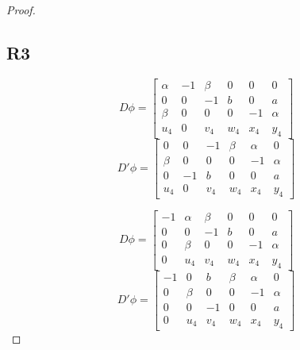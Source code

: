 \begin{proof}
  \subsection*{\centering R3}

  $$D\phi=
  \begin{bmatrix}
    \alpha & -1 & \beta & 0 & 0 & 0 \\ 
    0 & 0 & -1 & b & 0 & a \\ 
    \beta & 0 & 0 & 0 & -1 & \alpha \\ 
    u_4 & 0 & v_4 & w_4 & x_4 & y_4
  \end{bmatrix}
  $$
  $$D'\phi=
  \begin{bmatrix}
    0 & 0 & -1 & \beta & \alpha & 0 \\ 
    \beta & 0 & 0 & 0 & -1 & \alpha \\ 
    0 & -1 & b & 0 & 0 & a\\ 
    u_4 & 0 & v_4 & w_4 & x_4 & y_4
  \end{bmatrix}
  $$
  
  $$D\phi=
  \begin{bmatrix}
    -1 & \alpha  & \beta & 0 & 0 & 0 \\ 
    0 & 0 & -1 & b & 0 & a \\ 
    0 & \beta & 0 & 0 & -1 & \alpha \\ 
    0 & u_4 & v_4 & w_4 & x_4 & y_4
  \end{bmatrix}
  $$
  $$D'\phi=
  \begin{bmatrix}
    -1 & 0      & b     & \beta  & \alpha & 0      \\ 
    0  & \beta  & 0     & 0      & -1     & \alpha \\ 
    0  & 0      & -1    & 0      & 0      & a      \\ 
    0  & u_4    & v_4   & w_4    & x_4    & y_4
  \end{bmatrix}
  $$

  
\end{proof}
